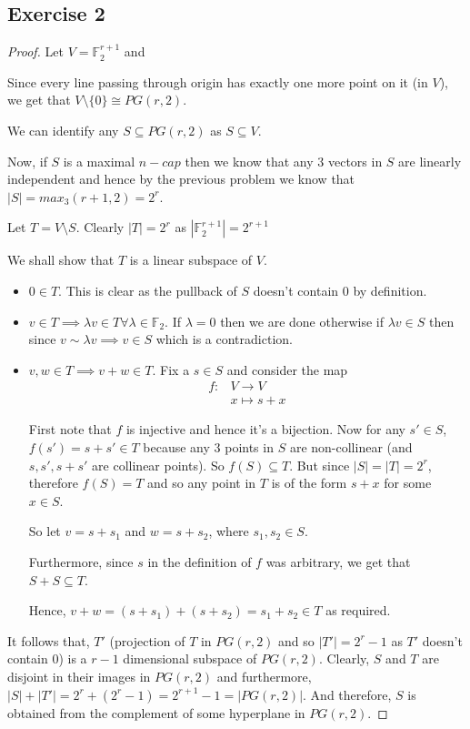 \documentclass[12pt]{article}
\begin{document}
\subsection*{Exercise 2}
\begin{proof}
Let $V = \mathbb{F}_2^{r+1}$ and

Since every line passing through origin has exactly one more point on it (in $V$), we get that $V \setminus \{0\} \cong PG(r,2)$.

We can identify any $S \subseteq PG(r,2)$ as $S \subseteq V$.

Now, if $S$ is a maximal $n-cap$ then we know that any $3$ vectors in $S$ are linearly independent and hence by the previous problem we know that $|S| = max_3(r+1,2) = 2^r$.

Let $T = V \setminus S$. Clearly $|T| = 2^r$ as $|\mathbb{F}_2^{r+1}| = 2^{r+1}$

We shall show that $T$ is a linear subspace of $V$.
\begin{itemize}
    \item $0 \in T$. This is clear as the pullback of $S$ doesn't contain $0$ by definition.
    
    \item $v \in T \implies \lambda v \in T \forall \lambda \in \mathbb{F}_2$. If $\lambda = 0$ then we are done otherwise if $\lambda v \in S$ then since $v \sim \lambda v \implies v \in S$ which is a contradiction.
    
    \item $v, w \in T \implies v+w \in T$. Fix a $s \in S$ and consider the map 
    \begin{align*}
        f: &V \longrightarrow V \\ 
        & x \longmapsto s+x
    \end{align*}
    
    First note that $f$ is injective and hence it's a bijection.
    Now for any $s' \in S$, $f(s') = s+s' \in T$ because any 3 points in $S$ are non-collinear (and $s, s', s+s'$ are collinear points). So $f(S) \subseteq T$. But since $|S| = |T| = 2^r$, therefore $f(S) = T$ and so any point in $T$ is of the form $s+x$ for some $x \in S$.
    
    So let $v = s + s_1$ and $w = s + s_2$, where $s_1, s_2 \in S$. 
    
    Furthermore, since $s$ in the definition of $f$ was arbitrary, we get that $S+S \subseteq T$.
    
    Hence, $v+w = (s+s_1) + (s+s_2) = s_1 + s_2 \in T$ as required.
\end{itemize}

It follows that, $T'$ (projection of $T$ in $PG(r,2)$ and so $|T'| = 2^r-1$ as $T'$ doesn't contain $0$) is a $r-1$ dimensional subspace of $PG(r,2)$. Clearly, $S$ and $T$ are disjoint in their images in $PG(r,2)$ and furthermore, $|S| + |T'| = 2^r + (2^r - 1) = 2^{r+1} - 1 = |PG(r,2)|$. And therefore, $S$ is obtained from the complement of some hyperplane in $PG(r,2)$.
\end{proof}
\end{document}
